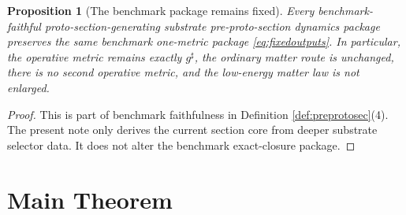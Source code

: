 \documentclass[11pt]{article}
\newcommand{\CompletedMetric}{g^{\sharp}}
\newtheorem{proposition}{Proposition}
\begin{document}
\begin{proposition}[The benchmark package remains fixed]
\label{prop:benchmark}
Every benchmark-faithful proto-section-generating substrate pre-proto-section dynamics package preserves the same benchmark one-metric package \eqref{eq:fixedoutputs}. In particular, the operative metric remains exactly \(\CompletedMetric\), the ordinary matter route is unchanged, there is no second operative metric, and the low-energy matter law is not enlarged.
\end{proposition}

\begin{proof}
This is part of benchmark faithfulness in Definition \ref{def:preprotosec}(4). The present note only derives the current section core from deeper substrate selector data. It does not alter the benchmark exact-closure package.
\end{proof}

\section{Main Theorem}
\end{document}
